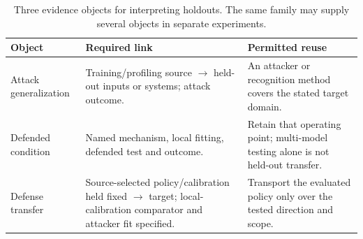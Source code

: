 \begin{table}[t]\centering\footnotesize
\caption{Three evidence objects for interpreting holdouts. The same family may supply several objects in separate experiments.}\label{tab:r26-transfer-objects}
\begin{tabularx}{\columnwidth}{@{}p{}YY@{}}\toprule
Object & Required link & Permitted reuse\\\midrule
Attack generalization & Training/profiling source $\to$ held-out inputs or systems; attack outcome. & An attacker or recognition method covers the stated target domain.\\
Defended condition & Named mechanism, local fitting, defended test and outcome. & Retain that operating point; multi-model testing alone is not held-out transfer.\\
Defense transfer & Source-selected policy/calibration held fixed $\to$ target; local-calibration comparator and attacker fit specified. & Transport the evaluated policy only over the tested direction and scope.\\\bottomrule
\end{tabularx}\end{table}
